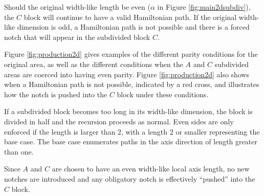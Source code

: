 Should the original width-like length be even ($\alpha$ in Figure \ref{fig:main2dsubdiv}), the $C$ block will continue to have 
a valid Hamiltonian path.
If the original width-like dimension is odd, a Hamiltonian path is not possible and there is a forced notch that will appear in the subdivided block $C$.

Figure \ref{fig:production2d} gives examples of the different parity conditions for the original area,
as well as the different conditions when the $A$ and $C$ subdivided areas are coerced into having even parity.
Figure \ref{fig:production2d} also shows when a Hamiltonian
path is not possible, indicated by a red cross, and illustrates how the notch is pushed into the $C$ block
under these conditions.

If a subdivided block becomes too long in its width-like dimension, the block is divided in half and the recursion
proceeds as normal.
Even sides are only enforced if the length is larger than 2, with a length 2 or smaller representing the base
case.
The base case enumerates paths in the axis direction of length greater than one.

Since $A$ and $C$ are chosen to have an even width-like local axis length, no new notches are introduced and any
obligatory notch is effectively ``pushed'' into the $C$ block.




